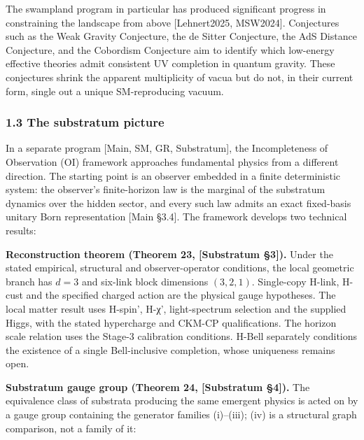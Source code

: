 \documentclass[
]{article}
\begin{document}
The swampland program in particular has produced significant progress in
constraining the landscape from above {[}Lehnert2025, MSW2024{]}.
Conjectures such as the Weak Gravity Conjecture, the de Sitter
Conjecture, the AdS Distance Conjecture, and the Cobordism Conjecture
aim to identify which low-energy effective theories admit consistent UV
completion in quantum gravity. These conjectures shrink the apparent
multiplicity of vacua but do not, in their current form, single out a
unique SM-reproducing vacuum.

\hypertarget{the-substratum-picture}{%
\subsubsection{1.3 The substratum
picture}\label{the-substratum-picture}}

In a separate program {[}Main, SM, GR, Substratum{]}, the Incompleteness
of Observation (OI) framework approaches fundamental physics from a
different direction. The starting point is an observer embedded in a
finite deterministic system: the observer's finite-horizon law is the
marginal of the substratum dynamics over the hidden sector, and every
such law admits an exact fixed-basis unitary Born representation {[}Main
§3.4{]}. The framework develops two technical results:

\textbf{Reconstruction theorem (Theorem 23, {[}Substratum §3{]}).} Under
the stated empirical, structural and observer-operator conditions, the
local geometric branch has \(d=3\) and six-link block dimensions
\((3,2,1)\). Single-copy H-link, H-cust and the specified charged action
are the physical gauge hypotheses. The local matter result uses H-spin',
H-χ', light-spectrum selection and the supplied Higgs, with the stated
hypercharge and CKM-CP qualifications. The horizon scale relation uses
the Stage-3 calibration conditions. H-Bell separately conditions the
existence of a single Bell-inclusive completion, whose uniqueness
remains open.

\textbf{Substratum gauge group (Theorem 24, {[}Substratum §4{]}).} The
equivalence class of substrata producing the same emergent physics is
acted on by a gauge group containing the generator families (i)--(iii);
(iv) is a structural graph comparison, not a family of it:
\end{document}
